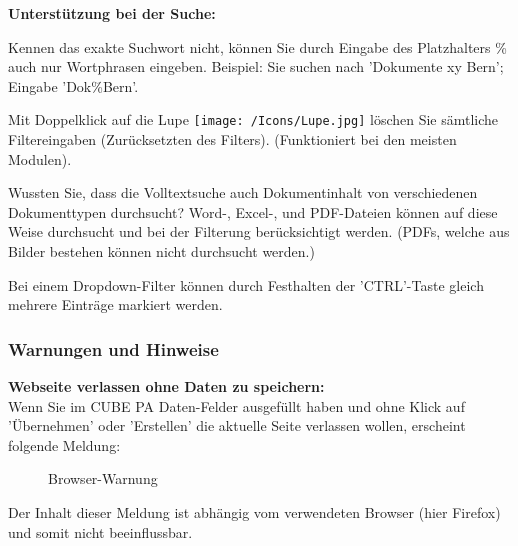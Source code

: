 \vspace{\baselineskip}

\textbf{Unterstützung bei der Suche:}
\begin{compactitem}
	\item Kennen das exakte Suchwort nicht, können Sie durch Eingabe des Platzhalters \% auch nur Wortphrasen eingeben. Beispiel: Sie suchen nach 'Dokumente xy Bern'; Eingabe 'Dok\%Bern'.
	\item Mit Doppelklick auf die Lupe \texttt{[image: /Icons/Lupe.jpg]} löschen Sie sämtliche Filtereingaben (Zurücksetzten des Filters). (Funktioniert bei den meisten Modulen).
	\item Wussten Sie, dass die Volltextsuche auch Dokumentinhalt von verschiedenen Dokumenttypen durchsucht? Word-, Excel-, und PDF-Dateien können auf diese Weise durchsucht und bei der Filterung berücksichtigt werden. (PDFs, welche aus Bilder bestehen können nicht durchsucht werden.)
	\item Bei einem Dropdown-Filter können durch Festhalten der 'CTRL'-Taste gleich mehrere Einträge markiert werden.
\end{compactitem}	

\subsubsection{Warnungen und Hinweise}

\textbf{Webseite verlassen ohne Daten zu speichern:} \\
Wenn Sie im CUBE PA Daten-Felder ausgefüllt haben und ohne Klick auf 'Übernehmen' oder 'Erstellen' die aktuelle Seite verlassen wollen, erscheint folgende Meldung: 

\begin{figure}[H]
\caption{Browser-Warnung}
\end{figure}
\begin{small}
Der Inhalt dieser Meldung ist abhängig vom verwendeten Browser (hier Firefox) und somit nicht beeinflussbar.
\end{small}

\vspace{\baselineskip}

